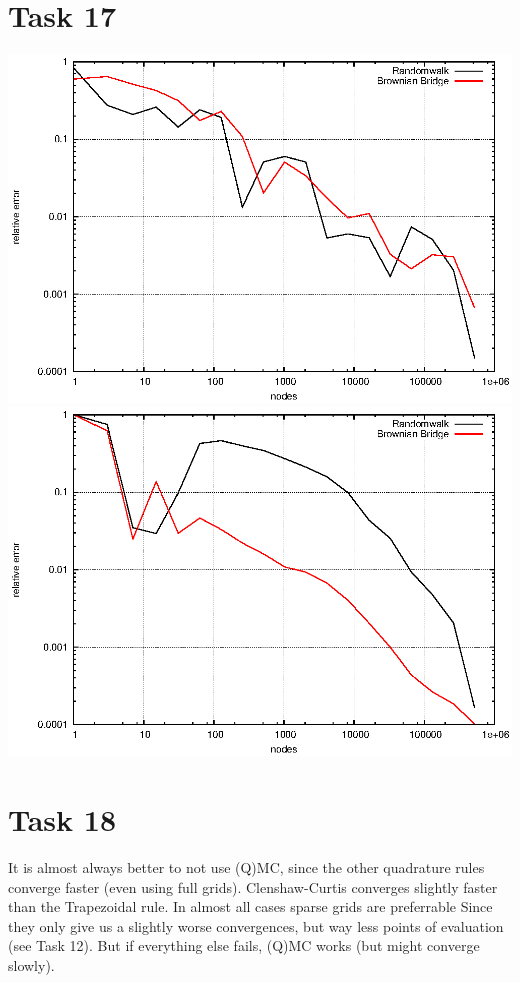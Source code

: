 \documentclass[]{article}
\begin{document}
\section*{Task 17}
\includegraphics{task17_mc}\\
\includegraphics{task17_qmc}\\

\section*{Task 18}
It is almost always better to not use (Q)MC, since the other quadrature rules converge faster (even using full grids). Clenshaw-Curtis converges slightly faster than the Trapezoidal rule. In almost all cases sparse grids are preferrable Since they only give us a slightly worse convergences, but way less points of evaluation (see Task 12). But if everything else fails, (Q)MC works (but might converge slowly).
\end{document}
